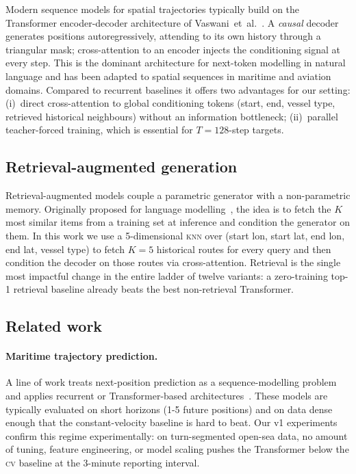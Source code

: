 \documentclass[11pt,a4paper]{article}
\newcommand{\knn}{\textsc{knn}}
\begin{document}
Modern sequence models for spatial trajectories typically build on the
Transformer encoder-decoder architecture of
Vaswani~et~al.~\cite{vaswani2017attention}.
A \emph{causal} decoder generates positions autoregressively, attending
to its own history through a triangular mask; cross-attention to an
encoder injects the conditioning signal at every step.
This is the dominant architecture for next-token modelling in natural
language and has been adapted to spatial sequences in maritime
\cite{nguyen2020transformer} and aviation \cite{shi2020convtransformer}
domains.  Compared to recurrent baselines it offers two advantages
for our setting:
(i)~direct cross-attention to global conditioning tokens (start, end,
vessel type, retrieved historical neighbours) without an information
bottleneck;
(ii)~parallel teacher-forced training, which is essential for
$T = 128$-step targets.

\subsection{Retrieval-augmented generation}

Retrieval-augmented models couple a parametric generator with a
non-parametric memory.  Originally proposed for language
modelling~\cite{khandelwal2020nearest,lewis2020retrieval}, the idea is
to fetch the $K$ most similar items from a training set at inference and
condition the generator on them.
In this work we use a 5-dimensional \knn{} over
(start lon, start lat, end lon, end lat, vessel type) to fetch $K = 5$
historical routes for every query and then condition the decoder on
those routes via cross-attention.
Retrieval is the single most impactful change in the entire ladder of
twelve variants: a zero-training top-1 retrieval baseline already beats
the best non-retrieval Transformer.

\subsection{Related work}\label{sec:related}

\paragraph{Maritime trajectory prediction.}
A line of work treats next-position prediction as a sequence-modelling
problem and applies recurrent or Transformer-based
architectures~\cite{nguyen2020transformer,capobianco2021lstm}.  These
models are typically evaluated on short horizons (1-5 future positions)
and on data dense enough that the constant-velocity baseline is hard to
beat.  Our v1 experiments confirm this regime experimentally: on
turn-segmented open-sea data, no amount of tuning, feature engineering,
or model scaling pushes the Transformer below the \textsc{cv} baseline
at the 3-minute reporting interval.
\end{document}
